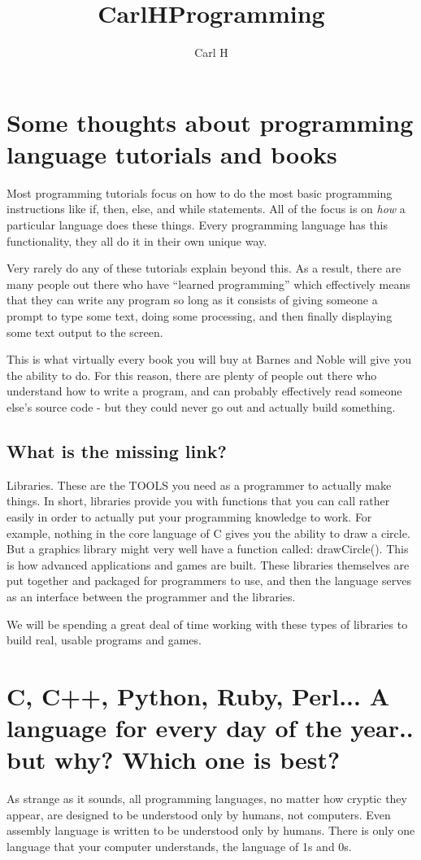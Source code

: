 \documentclass[a4paper,12pt]{article}
\author{Carl H}
\title{CarlHProgramming}
\let\stdsection\section
\renewcommand\section{\newpage\stdsection}
\begin{document}
\setcounter{secnumdepth}{-1}
\tableofcontents
\pagebreak

\section{Some thoughts about programming language tutorials and books}
Most programming tutorials focus on how to do the most basic programming instructions like if, then, else, and while statements. All of the focus is on \emph{how} a particular language does these things. Every programming language has this functionality, they all do it in their own unique way.

Very rarely do any of these tutorials explain beyond this. As a result, there are many people out there who have ``learned programming'' which effectively means that they can write any program so long as it consists of giving someone a prompt to type some text, doing some processing, and then finally displaying some text output to the screen.

This is what virtually every book you will buy at Barnes and Noble will give you the ability to do. For this reason, there are plenty of people out there who understand how to write a program, and can probably effectively read someone else's source code - but they could never go out and actually build something.

\subsection{What is the missing link?}

Libraries. These are the TOOLS you need as a programmer to actually make things. In short, libraries provide you with functions that you can call rather easily in order to actually put your programming knowledge to work. For example, nothing in the core language of C gives you the ability to draw a circle. But a graphics library might very well have a function called: drawCircle().
This is how advanced applications and games are built. These libraries themselves are put together and packaged for programmers to use, and then the language serves as an interface between the programmer and the libraries.

We will be spending a great deal of time working with these types of libraries to build real, usable programs and games.
\section{C, C++, Python, Ruby, Perl... A language for every day of the year.. but why? Which one is best?}
As strange as it sounds, all programming languages, no matter how cryptic they appear, are designed to be understood only by humans, not computers. Even assembly language is written to be understood only by humans. There is only one language that your computer understands, the language of 1s and 0s.
\end{document}
